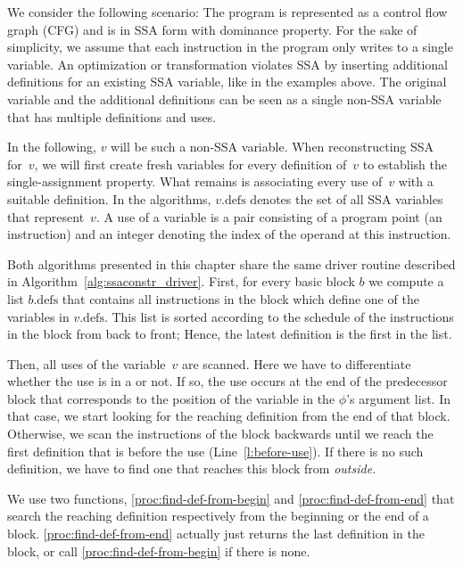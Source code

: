 {We consider the following scenario: The program is represented as a control flow graph (CFG) and is in SSA form with dominance property.
For the sake of simplicity, we assume that each instruction in the program only writes to a single variable.
An optimization or transformation violates SSA by inserting additional definitions for an existing SSA variable, like in the examples above.
The original variable and the additional definitions can be seen as a single non-SSA variable that has multiple definitions and uses.

In the following, $v$ will be such a non-SSA variable.
When reconstructing SSA for~$v$, we will first create fresh variables for every definition of~$v$ to establish the single-assignment property. 
What remains is associating every use of~$v$ with a suitable definition.
In the algorithms, $v.\textrm{defs}$ denotes the set of all SSA variables that represent~$v$.
A use of a variable is a pair consisting of a program point (an instruction) and an integer denoting the index of the operand at this instruction.

Both algorithms presented in this chapter share the same driver routine 
described in Algorithm~\ref{alg:ssaconstr_driver}.
First, for every basic block $b$ we compute a list $b.\textrm{defs}$ that contains all instructions in the block which define one of the variables in $v.\textrm{defs}$.
This list is sorted according to the schedule of the instructions in the block from back to front; Hence, the latest definition is the first in the list.

Then, all uses of the variable~$v$ are scanned.
Here we have to differentiate whether the use is in a \phifun or not.
If so, the use occurs at the end of the predecessor block that corresponds to the position of the variable in the $\phi$'s argument list.
In that case, we start looking for the reaching definition from the end of that block.
Otherwise, we scan the instructions of  the block backwards until we reach the first definition that is before the use (Line~\ref{l:before-use}).
If there is no such definition, we have to find one that reaches this block from \emph{outside.}

We use two functions, \ref{proc:find-def-from-begin} and \ref{proc:find-def-from-end} that search the reaching definition respectively from the beginning or the end of a block.
\ref{proc:find-def-from-end} actually just returns the last definition in the block, or call \ref{proc:find-def-from-begin} if there is none.

}
